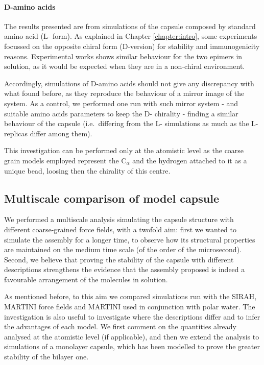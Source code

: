 \paragraph{D-amino acids} The results presented are from simulations of the capsule composed by standard amino acid (L- form). As explained in Chapter \ref{chapter:intro}, some experiments focussed on the opposite chiral form (D-version) for stability and immunogenicity reasons. Experimental works shows similar behaviour for the two epimers in solution, as it would be expected when they are in a non-chiral environment.

Accordingly, simulations of D-amino acids should not give any discrepancy with what found before, as they reproduce the behaviour of a mirror image of the system. As a control, we performed one run with such mirror system - and suitable amino acids parameters to keep the D- chirality - finding a similar behaviour of the capsule (i.e.\ differing from the L- simulations as much as the L- replicas differ among them).

This investigation can be performed only at the atomistic level as the coarse grain models employed represent the C$_\alpha$ and the hydrogen attached to it as a unique bead, loosing then the chirality of this centre.


\subsection{Multiscale comparison of model capsule} \label{sec:res_multiscale}

We performed a multiscale analysis simulating the capsule structure with different coarse-grained force fields, with a twofold aim: first we wanted to simulate the assembly for a longer time, to observe how its structural properties are maintained on the medium time scale (of the order of the microsecond). Second, we believe that proving the stability of the capsule with different descriptions strengthens the evidence that the assembly proposed is indeed a favourable arrangement of the molecules in solution.

As mentioned before, to this aim we compared simulations run with the SIRAH, MARTINI force fields and MARTINI used in conjunction with polar water. The investigation is also useful to investigate where the descriptions differ and to infer the advantages of each model.
%
We first comment on the quantities already analysed at the atomistic level (if applicable), and then we extend the analysis to simulations of a monolayer capsule, which has been modelled to prove the greater stability of the bilayer one.

